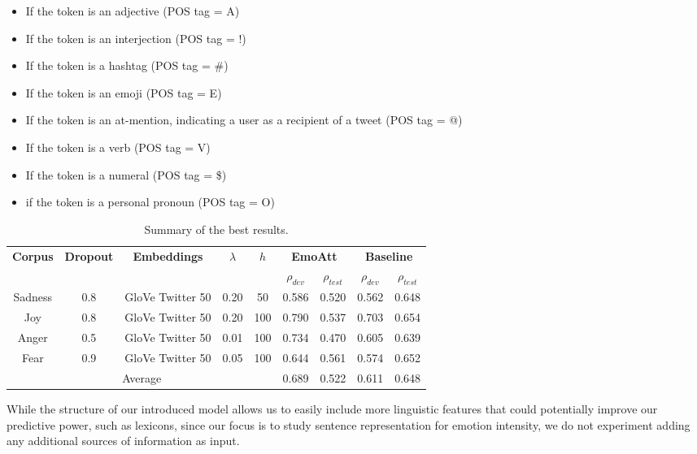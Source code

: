 \documentclass[11pt,letterpaper]{article}
\begin{document}
\begin{itemize}
	\item If the token is an adjective (POS tag = A)
	\item If the token is an interjection (POS tag = !)
	\item If the token is a hashtag (POS tag = \#)
	\item If the token is an emoji (POS tag = E)
	\item If the token is an at-mention, indicating a user as a recipient of a tweet (POS tag = @)
	\item If the token is a verb (POS tag = V)
	\item If the token is a numeral (POS tag = \$)
	\item if the token is a personal pronoun (POS tag = O)

\end{itemize}


\begin{table*}[t]
	\centering
	\begin{tabular}{c | c | c | c | c | c | c | c | c}
		\multirow{2}{*}{\textbf{Corpus}} & \multirow{2}{*}{\textbf{Dropout}} & \multirow{2}{*}{\textbf{Embeddings}} & \multirow{2}{*}{$\lambda$} & \multirow{2}{*}{$h$} & 
		\multicolumn{2}{|c|}{\textbf{EmoAtt}} & \multicolumn{2}{|c}{\textbf{Baseline}}\\
		\cline{6-9}
		& & & & & $\rho_{dev}$ & $\rho_{test}$  & $\rho_{dev}$ &  $\rho_{test}$ \\
		\hline
		Sadness & 0.8     & GloVe Twitter 50 & 0.20 	& 50   & 0.586  & 0.520  & 0.562  & 0.648  \\
		Joy     & 0.8     & GloVe Twitter 50 & 0.20		& 100  & 0.790  & 0.537  & 0.703  & 0.654 \\
		Anger   & 0.5     & GloVe Twitter 50 & 0.01   	& 100  & 0.734  & 0.470  & 0.605  & 0.639 \\
		Fear    & 0.9     & GloVe Twitter 50 & 0.05   	& 100  & 0.644  & 0.561  & 0.574  & 0.652 \\
		\hline
		\multicolumn{5}{c|}{Average} 						   & 0.689  & 0.522  & 0.611  & 0.648
		
	\end{tabular}
	\caption{Summary of the best results.}
	\label{table:result_sumarry}
\end{table*}

While the structure of our introduced model allows us to easily include more linguistic features that could potentially improve our predictive power, such as lexicons, since our focus is to study sentence representation for emotion intensity, we do not experiment adding any additional sources of information as input.
\end{document}

